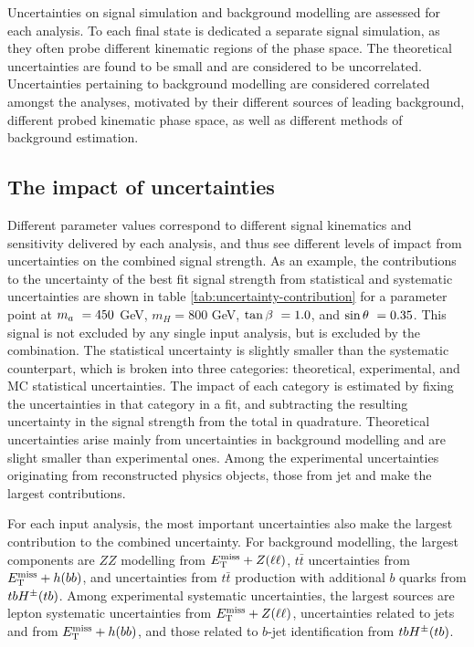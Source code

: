 Uncertainties on signal simulation and background modelling are assessed for each analysis. To each final state is dedicated a separate signal simulation, as they often probe different kinematic regions of the phase space. The theoretical uncertainties are found to be small and are considered to be uncorrelated. Uncertainties pertaining to background modelling are considered correlated amongst the analyses, motivated by their different sources of leading background, different probed kinematic phase space, as well as different methods of background estimation.

\subsection{The impact of uncertainties}

Different \thdma parameter values correspond to different signal kinematics and sensitivity delivered by each analysis, and thus see different levels of impact from uncertainties on the combined signal strength. As an example, the contributions to the uncertainty of the best fit signal strength from statistical and systematic uncertainties are shown in table \ref{tab:uncertainty-contribution} for a parameter point at $m_a~=450$ GeV, $m_H=800$ GeV, $\tan\beta~=1.0$, and $\sin\theta~=0.35$. This signal is not excluded by any single input analysis, but is excluded by the combination. The statistical uncertainty is slightly smaller than the systematic counterpart, which is broken into three categories: theoretical, experimental, and MC statistical uncertainties. The impact of each category is estimated by fixing the uncertainties in that category in a fit, and subtracting the resulting uncertainty in the signal strength from the total in quadrature. Theoretical uncertainties arise mainly from uncertainties in background modelling and are slight smaller than experimental ones. Among the experimental uncertainties originating from reconstructed physics objects, those from jet and \met make the largest contributions. 

For each input analysis, the most important uncertainties also make the largest contribution to the combined uncertainty. For background modelling, the largest components are $ZZ$ modelling from $E_{\mathrm{T}}^{\mathrm{miss}}+Z(\ell\ell)$, $t\bar{t}$ uncertainties from $E_{\mathrm{T}}^{\mathrm{miss}}+h(bb)$, and uncertainties from $t\bar{t}$ production with additional $b$ quarks from $tbH^{\pm}(tb)$. Among experimental systematic uncertainties, the largest sources are lepton systematic uncertainties from $E_{\mathrm{T}}^{\mathrm{miss}}+Z(\ell\ell)$, uncertainties related to jets and \met from $E_{\mathrm{T}}^{\mathrm{miss}}+h(bb)$, and those related to $b$-jet identification from $tbH^{\pm}(tb)$.

